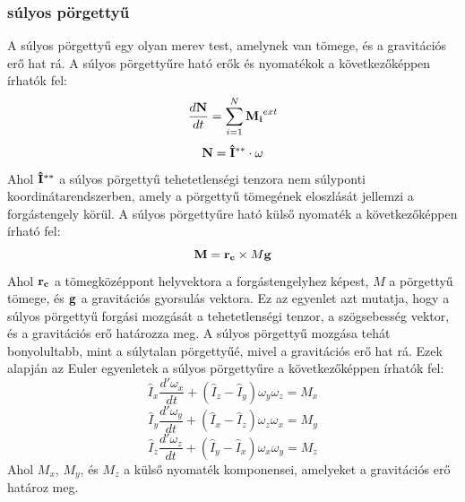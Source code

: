 \documentclass[../main.tex]{subfiles}
\begin{document}
\subsubsection*{súlyos pörgettyű}
A súlyos pörgettyű egy olyan merev test, amelynek van tömege, és a gravitációs erő hat rá. A súlyos pörgettyűre ható erők és nyomatékok a következőképpen írhatók fel:
\begin{equation}
    \frac{d\bold{N}}{dt} = \sum_{i=1}^{N} \bold{M_i}^{ext}
\end{equation}
\begin{equation}
    \bold{N} = \bold{\hat{I}^{**}} \cdot \bold{\omega}
\end{equation}
Ahol $\bold{\hat{I}^{**}}$ a súlyos pörgettyű tehetetlenségi tenzora nem súlyponti koordinátarendszerben, amely a pörgettyű tömegének eloszlását jellemzi a forgástengely körül.
A súlyos pörgettyűre ható külső nyomaték a következőképpen írható fel:
\begin{equation}
    \bold{M} = \bold{r_c} \times M \bold{g}
\end{equation}
Ahol $\bold{r_c}$ a tömegközéppont helyvektora a forgástengelyhez képest, $M$ a pörgettyű tömege, és $\bold{g}$ a gravitációs gyorsulás vektora.
Ez az egyenlet azt mutatja, hogy a súlyos pörgettyű forgási mozgását a tehetetlenségi tenzor, a szögsebesség vektor, és a gravitációs erő határozza meg. A súlyos pörgettyű mozgása tehát bonyolultabb, mint a súlytalan pörgettyűé, mivel a gravitációs erő hat rá.
Ezek alapján az Euler egyenletek a súlyos pörgettyűre a következőképpen írhatók fel:
\begin{equation}
    \hat{I}_x \frac{d'\omega_x}{dt} + (\hat{I}_z - \hat{I}_y) \omega_y \omega_z = M_x
\end{equation}
\begin{equation}
    \hat{I}_y \frac{d'\omega_y}{dt} + (\hat{I}_x - \hat{I}_z) \omega_z \omega_x = M_y
\end{equation}
\begin{equation}
    \hat{I}_z \frac{d'\omega_z}{dt} + (\hat{I}_y - \hat{I}_x) \omega_x \omega_y = M_z
\end{equation}
Ahol $M_x$, $M_y$, és $M_z$ a külső nyomaték komponensei, amelyeket a gravitációs erő határoz meg.
\end{document}
